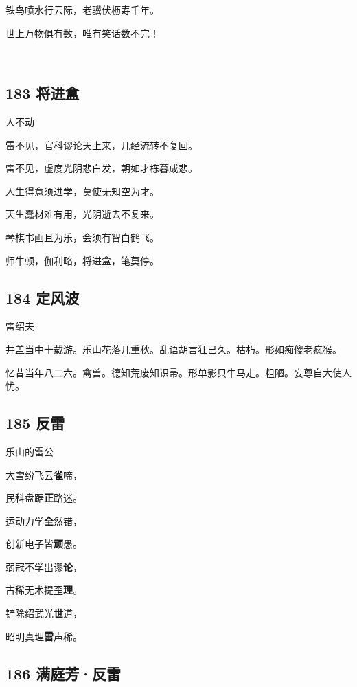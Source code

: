铁鸟喷水行云际，老骥伏枥寿千年。

世上万物俱有数，唯有笑话数不完！

~\\

\hypertarget{ux5c06ux8fdbux76d2}{%
\subsection{183 将进盒}\label{ux5c06ux8fdbux76d2}}

人不动

雷不见，官科谬论天上来，几经流转不复回。

雷不见，虚度光阴悲白发，朝如才栋暮成悲。

人生得意须进学，莫使无知空为才。

天生蠢材难有用，光阴逝去不复来。

琴棋书画且为乐，会须有智白鹤飞。

师牛顿，伽利略，将进盒，笔莫停。

\hypertarget{ux5b9aux98ceux6ce2-2}{%
\subsection{184 定风波}\label{ux5b9aux98ceux6ce2-2}}

雷绍夫

井盖当中十载游。乐山花落几重秋。乱语胡言狂已久。枯朽。形如痴傻老疯猴。

忆昔当年八二六。禽兽。德知荒废知识帚。形单影只牛马走。粗陋。妄尊自大使人忧。
~\\

\hypertarget{ux53cdux96f7-3}{%
\subsection{185 反雷}\label{ux53cdux96f7-3}}

乐山的雷公

大雪纷飞云\textbf{雀}啼，

民科盘踞\textbf{正}路迷。

运动力学\textbf{全}然错，

创新电子皆\textbf{顽}愚。

弱冠不学出谬\textbf{论}，

古稀无术提歪\textbf{理}。

铲除绍武光\textbf{世}道，

昭明真理\textbf{雷}声稀。

\hypertarget{ux6ee1ux5eadux82b3ux53cdux96f7}{%
\subsection{186 满庭芳·反雷}\label{ux6ee1ux5eadux82b3ux53cdux96f7}}

